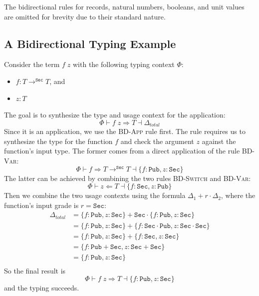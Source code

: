 \documentclass[conference]{IEEEtran}
\newcommand\public{\texttt{Pub}}
\newcommand\secret{\texttt{Sec}}
\newcommand\checking{\Leftarrow}
\newcommand\synthesis{\Rightarrow}
\begin{document}
The bidirectional rules for records, natural numbers, booleans, and unit values are omitted for brevity due to their standard nature.

\subsection{A Bidirectional Typing Example}

Consider the term $f\; z$ with the following typing context $\Phi$:
\begin{itemize}
    \item $f:T\to^\secret T$, and
    \item $z:T$
\end{itemize}
The goal is to synthesize the type and usage context for the application:
\begin{equation}
    \Phi\vdash f\; z\synthesis T\dashv\Delta_{total}
\end{equation}
Since it is an application, we use the \textsc{BD-App} rule first. The rule requires us to synthesize the type for the function $f$ and check the argument $z$ against the function's input type. The former comes from a direct application of the rule \textsc{BD-Var}:
\begin{equation}
    \Phi\vdash f\synthesis T\to^\secret T\dashv\{f:\public,z:\secret\}
\end{equation}
The latter can be achieved by combining the two rules \textsc{BD-Switch} and \textsc{BD-Var}:
\begin{equation}
    \Phi\vdash z\checking T\dashv\{f:\secret,z:\public\}
\end{equation}
Then we combine the two usage contexts using the formula $\Delta_1+r\cdot\Delta_2$, where the function's input grade is $r=\secret$:
\begin{equation}
    \begin{split}
        \Delta_{total}
        &=\{f:\public,z:\secret\}+\secret\cdot\{f:\public,z:\secret\}\\
        &=\{f:\public,z:\secret\}+\{f:\secret\cdot\public,z:\secret\cdot\secret\}\\
        &=\{f:\public,z:\secret\}+\{f:\secret,z:\secret\}\\
        &=\{f:\public+\secret,z:\secret+\secret\}\\
        &=\{f:\public,z:\secret\}\\
    \end{split}
\end{equation}
So the final result is
\begin{equation}
    \Phi\vdash f\; z\synthesis T\dashv\{f:\public,z:\secret\}
\end{equation}
and the typing succeeds.
\end{document}
